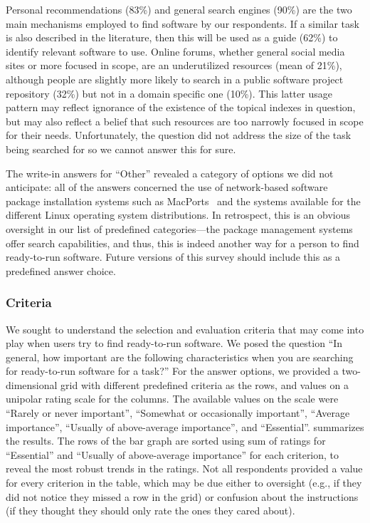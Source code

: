 \documentclass{casicswhitepaper}
\begin{document}
Personal recommendations (83\%) and general search engines (90\%) are the two main mechanisms employed to find software by our respondents. If a similar task is also described in the literature, then this will be used as a guide (62\%) to identify relevant software to use. Online forums, whether general social media sites or more focused in scope, are an underutilized resources (mean of 21\%), although people are slightly more likely to search in a public software project repository (32\%) but not in a domain specific one (10\%). This latter usage pattern may reflect ignorance of the existence of the topical indexes in question, but may also reflect a belief that such resources are too narrowly focused in scope for their needs. Unfortunately, the question did not address the size of the task being searched for so we cannot answer this for sure.

The write-in answers for ``Other'' revealed a category of options we did not anticipate: all of the answers concerned the use of network-based software package installation systems such as MacPorts~\cite{fuller2002macports} and the systems available for the different Linux operating system distributions.  In retrospect, this is an obvious oversight in our list of predefined categories---the package management systems offer search capabilities, and thus, this is indeed another way for a person to find ready-to-run software.  Future versions of this survey should include this as a predefined answer choice.


\subsubsection{Criteria}

We sought to understand the selection and evaluation criteria that may come into play when users try to find ready-to-run software.  We posed the question ``In general, how important are the following characteristics when you are searching for ready-to-run software for a task?''  For the answer options, we provided a two-dimensional grid with different predefined criteria as the rows, and values on a unipolar rating scale for the columns.  The available values on the scale were ``Rarely or never important'', ``Somewhat or occasionally important'', ``Average importance'', ``Usually of above-average importance'', and ``Essential''.  summarizes the results.  The rows of the bar graph are sorted using sum of ratings for ``Essential'' and ``Usually of above-average importance'' for each criterion, to reveal the most robust trends in the ratings.  Not all respondents provided a value for every criterion in the table, which may be due either to oversight (e.g., if they did not notice they missed a row in the grid) or confusion about the instructions (if they thought they should only rate the ones they cared about).
\end{document}
